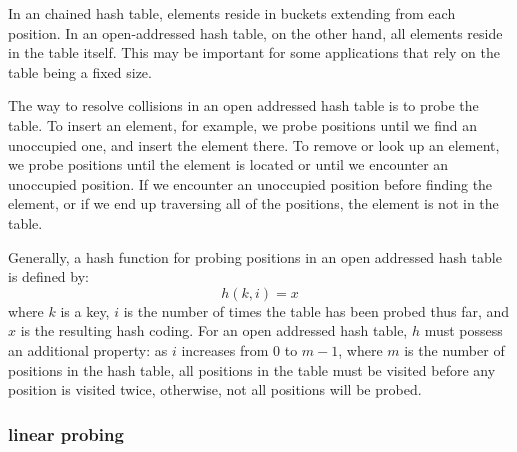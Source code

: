 \documentclass{article}
\begin{document}
    In an chained hash table, elements reside in buckets extending from each position. In an open-addressed hash table, on the other hand, all elements reside in the table itself. This may be important for some applications that rely on the table being a fixed size.

    The way to resolve collisions in an open addressed hash table is to probe the table. To insert an element, for example, we probe positions until we find an unoccupied one, and insert the element there. To remove or look up an element, we probe positions until the element is located or until we encounter an unoccupied position. If we encounter an unoccupied position before finding the element, or if we end up traversing all of the positions, the element is not in the table.

    Generally, a hash function for probing positions in an open addressed hash table is defined by:
    $$
    h(k,i) = x
    $$
    where $k$ is a key, $i$ is the number of times the table has been probed thus far, and $x$ is the resulting hash coding. For an open addressed hash table, $h$ must possess an additional property: as $i$ increases from 0 to $m - 1$, where $m$ is the number of positions in the hash table, all positions in the table must be visited before any position is visited twice, otherwise, not all positions will be probed.

    \subsubsection{linear probing}
    
\end{document}
